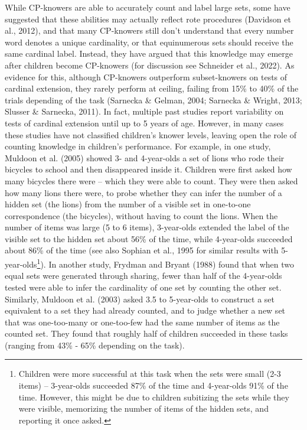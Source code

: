 \documentclass[
  man,floatsintext]{apa7}
\begin{document}
While CP-knowers are able to accurately count and label large sets, some have suggested that these abilities may actually reflect rote procedures (Davidson et al., 2012), and that many CP-knowers still don't understand that every number word denotes a unique cardinality, or that equinumerous sets should receive the same cardinal label. Instead, they have argued that this knowledge may emerge after children become CP-knowers (for discussion see Schneider et al., 2022). As evidence for this, although CP-knowers outperform subset-knowers on tests of cardinal extension, they rarely perform at ceiling, failing from 15\% to 40\% of the trials depending of the task (Sarnecka \& Gelman, 2004; Sarnecka \& Wright, 2013; Slusser \& Sarnecka, 2011). In fact, multiple past studies report variability on tests of cardinal extension until up to 5 years of age. However, in many cases these studies have not classified children's knower levels, leaving open the role of counting knowledge in children's performance. For example, in one study, Muldoon et al. (2005) showed 3- and 4-year-olds a set of lions who rode their bicycles to school and then disappeared inside it. Children were first asked how many bicycles there were -- which they were able to count. They were then asked how many lions there were, to probe whether they can infer the number of a hidden set (the lions) from the number of a visible set in one-to-one correspondence (the bicycles), without having to count the lions. When the number of items was large (5 to 6 items), 3-year-olds extended the label of the visible set to the hidden set about 56\% of the time, while 4-year-olds succeeded about 86\% of the time (see also Sophian et al., 1995 for similar results with 5-year-olds\footnote{Children were more successful at this task when the sets were small (2-3 items) -- 3-year-olds succeeded 87\% of the time and 4-year-olds 91\% of the time. However, this might be due to children subitizing the sets while they were visible, memorizing the number of items of the hidden sets, and reporting it once asked.}). In another study, Frydman and Bryant (1988) found that when two equal sets were generated through sharing, fewer than half of the 4-year-olds tested were able to infer the cardinality of one set by counting the other set. Similarly, Muldoon et al. (2003) asked 3.5 to 5-year-olds to construct a set equivalent to a set they had already counted, and to judge whether a new set that was one-too-many or one-too-few had the same number of items as the counted set. They found that roughly half of children succeeded in these tasks (ranging from 43\% - 65\% depending on the task).
\end{document}
